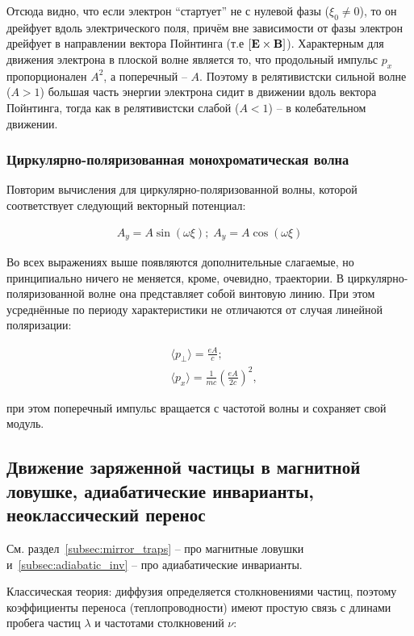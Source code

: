 \documentclass[10pt, a4paper]{article}
\begin{document}
Отсюда видно, что если электрон ``стартует'' не с нулевой фазы ($\xi_0 \neq 0$), то он дрейфует вдоль электрического поля, причём вне зависимости от фазы электрон дрейфует в направлении вектора Пойнтинга (т.е $[\vb{E}\times\vb{B}]$). Характерным для движения электрона в плоской волне является то, что продольный импульс $p_x$ пропорционален $A^2$, а поперечный -- $A$. Поэтому в релятивистски сильной волне ($A>1$) большая часть энергии электрона сидит в движении вдоль вектора Пойнтинга, тогда как в релятивистски слабой ($A<1$) -- в колебательном движении.

\subsubsection{Циркулярно-поляризованная монохроматическая волна}

Повторим вычисления для циркулярно-поляризованной волны, которой соответствует следующий векторный потенциал:

\begin{align*}
	A_y = A\sin\left( \omega \xi \right);\;	A_y = A\cos\left( \omega \xi \right)
\end{align*}

Во всех выражениях выше появляются дополнительные слагаемые, но принципиально ничего не меняется, кроме, очевидно, траектории. В циркулярно-поляризованной волне она представляет собой винтовую линию. При этом усреднённые по периоду характеристики не отличаются от случая линейной поляризации:

\begin{align*}
	&\langle p_\perp \rangle = \frac{eA}{c}; \\
	&\langle p_x \rangle = \frac{1}{mc} \left( \frac{eA}{2c} \right)^2,
\end{align*}

при этом поперечный импульс вращается с частотой волны и сохраняет свой модуль.

\subsection{Движение заряженной частицы в магнитной ловушке, адиабатические инварианты, неоклассический перенос}

См. раздел~\ref{subsec:mirror_traps} -- про магнитные ловушки и~\ref{subsec:adiabatic_inv} -- про адиабатические инварианты.

Классическая теория: диффузия определяется столкновениями частиц, поэтому коэффициенты переноса (теплопроводности) имеют простую связь с длинами пробега частиц $\lambda$ и частотами столкновений $\nu$:
\end{document}
